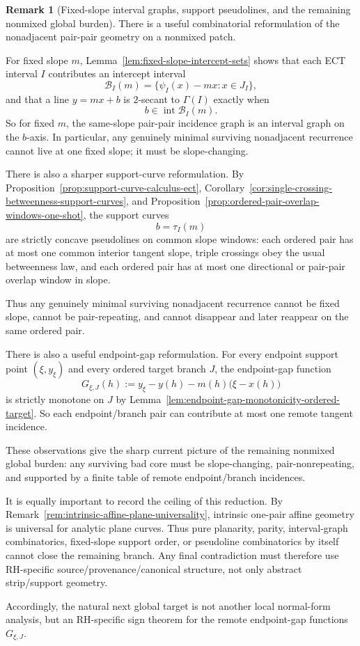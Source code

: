 \documentclass[11pt,a4paper]{amsart}
\theoremstyle{plain}
\theoremstyle{definition}
\newtheorem{remark}[theorem]{Remark}
\begin{document}
\begin{remark}[Fixed-slope interval graphs, support pseudolines, and the remaining nonmixed global burden]
\label{rem:fixed-slope-interval-graph-monge-support-global-burden}
There is a useful combinatorial reformulation of the nonadjacent pair-pair
geometry on a nonmixed patch.

For fixed slope $m$, Lemma~\ref{lem:fixed-slope-intercept-sets} shows that each
ECT interval $I$ contributes an intercept interval
\[
\mathcal B_I(m)=\{\psi_I(x)-mx:x\in J_I\},
\]
and that a line $y=mx+b$ is $2$-secant to $\Gamma(I)$ exactly when
\[
b\in \operatorname{int}\mathcal B_I(m).
\]
So for fixed $m$, the same-slope pair-pair incidence graph is an interval
graph on the $b$-axis. In particular, any genuinely minimal surviving
nonadjacent recurrence cannot live at one fixed slope; it must be
slope-changing.

There is also a sharper support-curve reformulation. By
Proposition~\ref{prop:support-curve-calculus-ect},
Corollary~\ref{cor:single-crossing-betweenness-support-curves}, and
Proposition~\ref{prop:ordered-pair-overlap-windows-one-shot}, the support
curves
\[
b=\tau_I(m)
\]
are strictly concave pseudolines on common slope windows: each ordered pair has
at most one common interior tangent slope, triple crossings obey the usual
betweenness law, and each ordered pair has at most one directional or pair-pair
overlap window in slope.

Thus any genuinely minimal surviving nonadjacent recurrence cannot be fixed
slope, cannot be pair-repeating, and cannot disappear and later reappear on the
same ordered pair.

There is also a useful endpoint-gap reformulation. For every endpoint support
point $(\xi,y_\xi)$ and every ordered target branch $J$, the endpoint-gap
function
\[
G_{\xi,J}(h):=y_\xi-y(h)-m(h)\bigl(\xi-x(h)\bigr)
\]
is strictly monotone on $J$ by
Lemma~\ref{lem:endpoint-gap-monotonicity-ordered-target}. So each
endpoint/branch pair can contribute at most one remote tangent incidence.

These observations give the sharp current picture of the remaining nonmixed
global burden: any surviving bad core must be slope-changing, pair-nonrepeating,
and supported by a finite table of remote endpoint/branch incidences.

It is equally important to record the ceiling of this reduction. By
Remark~\ref{rem:intrinsic-affine-plane-universality}, intrinsic one-pair affine
geometry is universal for analytic plane curves. Thus pure planarity, parity,
interval-graph combinatorics, fixed-slope support order, or pseudoline
combinatorics by itself cannot close the remaining branch. Any final
contradiction must therefore use RH-specific source/provenance/canonical
structure, not only abstract strip/support geometry.

Accordingly, the natural next global target is not another local normal-form
analysis, but an RH-specific sign theorem for the remote endpoint-gap functions
$G_{\xi,J}$.
\end{remark}
\end{document}
